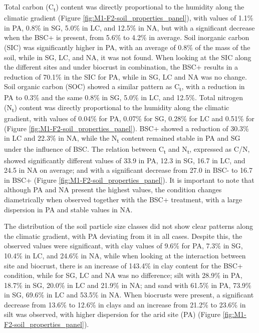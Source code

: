 Total carbon (C\textsubscript{t}) content was directly proportional to the humidity along the climatic gradient (Figure \ref{fig:M1-F2-soil_properties_panel}), with values of 1.1\% in PA, 0.8\% in SG, 5.0\% in LC, and 12.5\% in NA, but with a significant decrease when the BSC+ is present, from 5.6\% to 4.2\% in average. Soil inorganic carbon (SIC) was significantly higher in PA, with an average of 0.8\% of the mass of the soil, while in SG, LC, and NA, it was not found. When looking at the SIC along the different sites and under biocrust in combination, the BSC+ results in a reduction of 70.1\% in the SIC for PA, while in SG, LC and NA was no change. Soil organic carbon (SOC) showed a similar pattern as C\textsubscript{t}, with a reduction in PA to 0.3\% and the same 0.8\% in SG, 5.0\% in LC, and 12.5\%. Total nitrogen (N\textsubscript{t}) content was directly proportional to the humidity along the climatic gradient, with values of 0.04\% for PA, 0.07\% for SG, 0.28\% for LC and 0.51\% for (Figure \ref{fig:M1-F2-soil_properties_panel}). BSC+ showed a reduction of 30.3\% in LC and 22.3\% in NA, while the N\textsubscript{t} content remained stable in PA and SG under the influence of BSC. The relation between C\textsubscript{t} and N\textsubscript{t}, expressed as C/N, showed significantly different values of 33.9 in PA, 12.3 in SG, 16.7 in LC, and 24.5 in NA on average; and with a significant decrease from 27.0 in BSC- to 16.7 in BSC+ (Figure \ref{fig:M1-F2-soil_properties_panel}). It is important to note that although PA and NA present the highest values, the condition changes diametrically when observed together with the BSC+ treatment, with a large dispersion in PA and stable values in NA.

The distribution of the soil particle size classes did not show clear patterns along the climatic gradient, with PA deviating from it in all cases. Despite this, the observed values were significant, with clay values of 9.6\% for PA, 7.3\% in SG, 10.4\% in LC, and 24.6\% in NA, while when looking at the interaction between site and biocrust, there is an increase of 143.4\% in clay content for the BSC+ condition, while for SG, LC and NA was no difference; silt with 28.9\% in PA, 18.7\% in SG, 20.0\% in LC and 21.9\% in NA; and sand with 61.5\% in PA, 73.9\% in SG, 69.6\% in LC and 53.5\% in NA. When biocrusts were present, a significant decrease from 13.6\% to 12.6\% in clays and an increase from 21.2\% to 23.6\% in silt was observed, with higher dispersion for the arid site (PA) (Figure \ref{fig:M1-F2-soil_properties_panel}).

